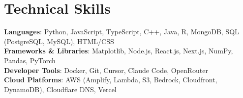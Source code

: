 \documentclass[letterpaper,10pt]{article}
\begin{document}
%
\section{Technical Skills}
 \begin{itemize}[leftmargin=0.15in, label={}]
    \small{\item{
     \textbf{Languages}{: Python, JavaScript, TypeScript, C++, Java, R, MongoDB, SQL (PostgreSQL, MySQL), HTML/CSS} \\
     \textbf{Frameworks \& Libraries}{: Matplotlib, Node.js, React.js, Next.js, NumPy, Pandas, PyTorch} \\
     \textbf{Developer Tools}{: Docker, Git, Cursor, Claude Code, OpenRouter} \\
     \textbf{Cloud Platforms}{: AWS (Amplify, Lambda, S3, Bedrock, Cloudfront, DynamoDB), Cloudflare DNS, Vercel}
    }}
 \end{itemize}


\end{document}
